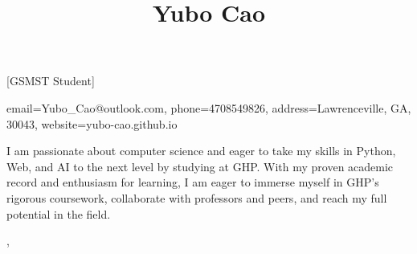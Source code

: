 \documentclass[sidebar-width=2.25in, primary=slate]{clean-resume}
\begin{document}
  \begin{sidebar}
    
    \title{Yubo Cao}[GSMST Student]
    
    
    \contact
    {
      email={Yubo\_Cao@outlook.com},
      phone=4708549826,
      address={Lawrenceville, GA, 30043},
      website={yubo-cao.github.io}
    }
    
    
    I am passionate about computer science and eager to take my skills in Python, Web, and AI to the next level by studying at GHP. With my proven academic record and enthusiasm for learning, I am eager to immerse myself in GHP's rigorous coursework, collaborate with professors and peers, and reach my full potential in the field.
  \end{sidebar}%
  \sep%
\end{document}
